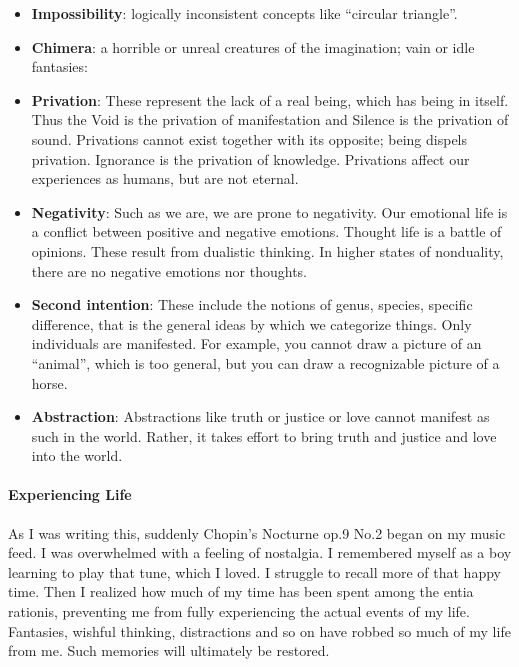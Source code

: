 \begin{itemize}


\item \textbf{Impossibility}: logically inconsistent concepts like ``circular triangle''.

\item \textbf{Chimera}: a horrible or unreal creatures of the imagination; vain or idle fantasies:

\item \textbf{Privation}: These represent the lack of a real being, which has being in itself. Thus the Void is the privation of manifestation and Silence is the privation of sound. Privations cannot exist together with its opposite; being dispels privation. Ignorance is the privation of knowledge. Privations affect our experiences as humans, but are not eternal.

\item \textbf{Negativity}: Such as we are, we are prone to negativity. Our emotional life is a conflict between positive and negative emotions. Thought life is a battle of opinions. These result from dualistic thinking. In higher states of nonduality, there are no negative emotions nor thoughts.

\item \textbf{Second intention}: These include the notions of genus, species, specific difference, that is the general ideas by which we categorize things. Only individuals are manifested. For example, you cannot draw a picture of an ``animal'', which is too general, but you can draw a recognizable picture of a horse.

\item \textbf{Abstraction}: Abstractions like truth or justice or love cannot manifest as such in the world. Rather, it takes effort to bring truth and justice and love into the world.
\end{itemize}


\paragraph{Experiencing Life}


As I was writing this, suddenly Chopin's Nocturne op.9 No.2 began on my music feed. I was overwhelmed with a feeling of nostalgia. I remembered myself as a boy learning to play that tune, which I loved. I struggle to recall more of that happy time. Then I realized how much of my time has been spent among the entia rationis, preventing me from fully experiencing the actual events of my life. Fantasies, wishful thinking, distractions and so on have robbed so much of my life from me. Such memories will ultimately be restored.


